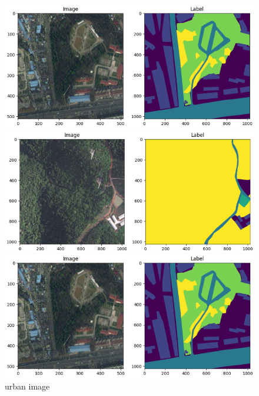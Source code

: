 \documentclass{article}
\begin{document}
\begin{multicols}{2}
	
		\begin{figure}[H]
			\centering
			\begin{minipage}{0.8\linewidth}
				\centering
				\includegraphics[width=1\linewidth]{image/nst/urban+mask2.png}

				
			\end{minipage}
			\begin{minipage}{0.8\linewidth}
				\centering
				\includegraphics[width=1\linewidth]{image/nst/rural+mask2.png}
				
			\end{minipage}

			\begin{minipage}{0.8\linewidth}
				\centering
				\includegraphics[width=1\linewidth]{image/nst/mixed+mask2.png}

			\end{minipage}


			\caption{urban image }
			\label{fig:transfer}

		\end{figure}


	\end{multicols}
\end{document}
